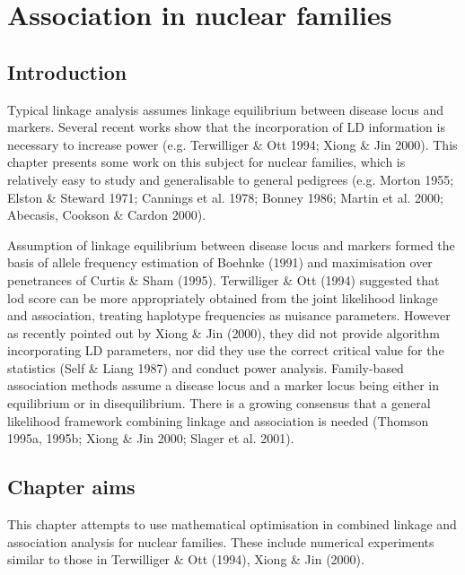 
\chapter{Association in nuclear families}

\section{Introduction}

Typical linkage analysis assumes linkage equilibrium between disease locus and
markers.  Several recent works show that the incorporation of LD information is
necessary to increase power (e.g.  Terwilliger \& Ott 1994; Xiong \& Jin 2000).
This chapter presents some work on this subject for nuclear families, which is
relatively easy to study and generalisable to general pedigrees (e.g.  Morton
1955; Elston \& Steward 1971; Cannings et al.  1978; Bonney 1986; Martin et al.
2000; Abecasis, Cookson \& Cardon 2000).

Assumption of linkage equilibrium between disease locus and markers formed the
basis of allele frequency estimation of Boehnke (1991) and maximisation over
penetrances of Curtis \& Sham (1995).  Terwilliger \& Ott (1994) suggested
that lod score can be more appropriately obtained from the joint likelihood
linkage and association, treating haplotype frequencies as nuisance parameters.
However as recently pointed out by Xiong \& Jin (2000), they did not provide
algorithm incorporating LD parameters, nor did they use the correct critical
value for the statistics (Self \& Liang 1987) and conduct power analysis.
Family-based association methods assume a disease locus and a marker locus
being either in equilibrium or in disequilibrium.  There is a growing consensus
that a general likelihood framework combining linkage and association is needed
(Thomson 1995a, 1995b; Xiong \& Jin 2000; Slager et al.  2001).


\section*{Chapter aims}

This chapter attempts to use mathematical optimisation in combined linkage and
association analysis for nuclear families.  These include numerical experiments
similar to those in Terwilliger \& Ott (1994), Xiong \& Jin (2000).


